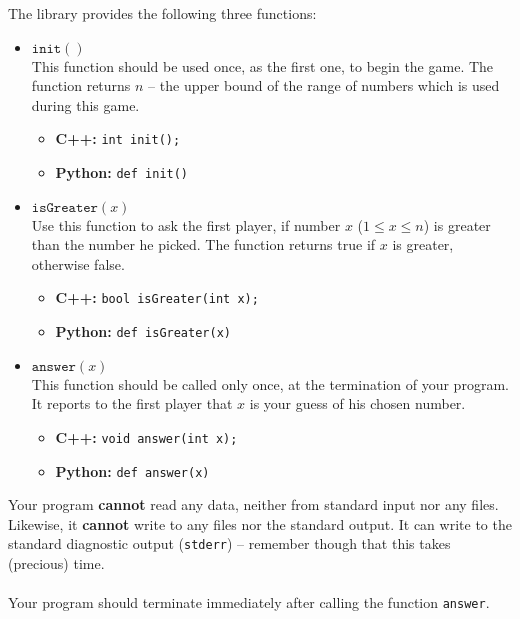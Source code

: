 \documentclass[en]{spiral}
\begin{document}
    \medskip\noindent
    The library provides the following three functions:
    \begin{itemize}
        \item $\texttt{init}()$ \\
            This function should be used once, as the first one, to begin the game.
            The function returns $n$ -- the upper bound of the range of numbers 
            which is used during this game.
            \begin{itemize}
                \item \textbf{C++:}
		                \texttt{int init();}

                \item \textbf{Python:}
		                \texttt{def init()}
            \end{itemize}

        \item $\texttt{isGreater}(x)$ \\
            Use this function to ask the first player,
            if number $x$ ($1 \leq x \leq n$)
            is greater than the number he picked.
            The function returns true if $x$ is greater, otherwise false.
            \begin{itemize}
                \item \textbf{C++:}
		                \texttt{bool isGreater(int x);}

                \item \textbf{Python:}
		                \texttt{def isGreater(x)}
            \end{itemize}

        \item $\texttt{answer}(x)$ \\
            This function should be called only once,
            at the termination of your program.
            It reports to the first player that $x$
            is your guess of his chosen number.
            \begin{itemize}
                \item \textbf{C++:}
		                \texttt{void answer(int x);}
                \item \textbf{Python:}
		                \texttt{def answer(x)}
            \end{itemize}
    \end{itemize}

    \noindent Your program \textbf{cannot} read any data,
    neither from standard input nor any files.
    Likewise, it \textbf{cannot} write to any files nor the standard output.
    It can write to the standard diagnostic output (\texttt{stderr}) -- remember
    though that this takes (precious) time.\\
    \\
    Your program should terminate immediately
    after calling the function \texttt{answer}.
\end{document}
